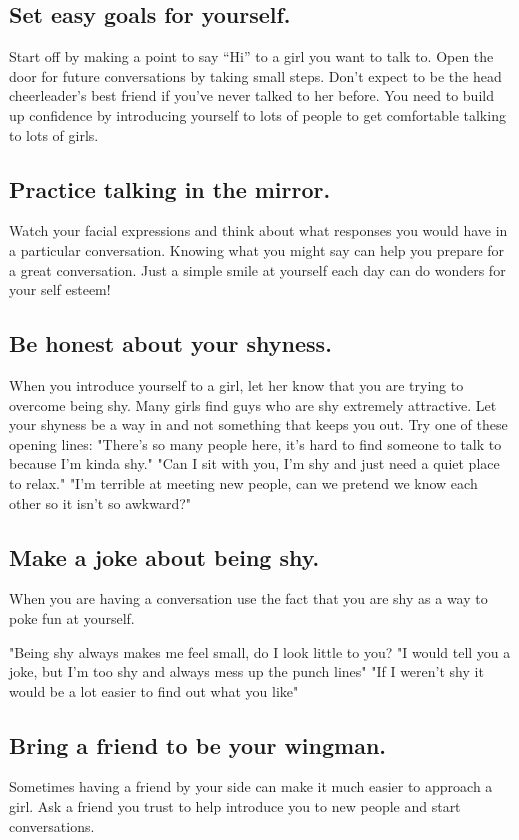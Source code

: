 \documentclass[12pt]{article}
\begin{document}
\subsection{Set easy goals for yourself.}
Start off by making a point to say “Hi” to a girl you want to talk to. Open the door for future conversations by taking small steps. Don’t expect to be the head cheerleader’s best friend if you’ve never talked to her before. You need to build up confidence by introducing yourself to lots of people to get comfortable talking to lots of girls.
\subsection{Practice talking in the mirror.}
Watch your facial expressions and think about what responses you would have in a particular conversation. Knowing what you might say can help you prepare for a great conversation. Just a simple smile at yourself each day can do wonders for your self esteem!
\subsection{Be honest about your shyness.}
When you introduce yourself to a girl, let her know that you are trying to overcome being shy. Many girls find guys who are shy extremely attractive. Let your shyness be a way in and not something that keeps you out. Try one of these opening lines:
    "There's so many people here, it's hard to find someone to talk to because I'm kinda shy."
    "Can I sit with you, I'm shy and just need a quiet place to relax."
    "I'm terrible at meeting new people, can we pretend we know each other so it isn't so awkward?"
\subsection{Make a joke about being shy.}
When you are having a conversation use the fact that you are shy as a way to poke fun at yourself.

    "Being shy always makes me feel small, do I look little to you?
    "I would tell you a joke, but I'm too shy and always mess up the punch lines"
    "If I weren't shy it would be a lot easier to find out what you like"
\subsection{Bring a friend to be your wingman.}
Sometimes having a friend by your side can make it much easier to approach a girl. Ask a friend you trust to help introduce you to new people and start conversations.
\end{document}
